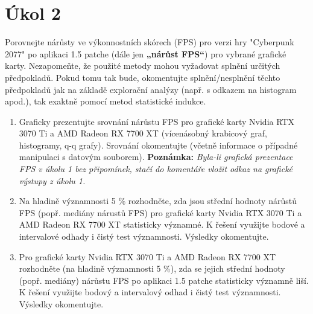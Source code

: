 \section*{Úkol 2}
\label{sec:task-2}

Porovnejte nárůsty ve výkonnostních skórech (FPS) pro verzi hry "Cyberpunk 2077" po aplikaci 1.5 patche (dále jen \textbf{„nárůst FPS“}) 
pro vybrané grafické karty. Nezapomeňte, že použité metody mohou vyžadovat splnění určitých předpokladů. Pokud tomu tak bude, okomentujte 
splnění/nesplnění těchto předpokladů jak na základě explorační analýzy (např. s odkazem na histogram apod.), tak exaktně pomocí metod statistické indukce.

\begin{enumerate}[label=\alph*]
    \item Graficky prezentujte srovnání nárůstu FPS pro grafické karty Nvidia RTX 3070 Ti a AMD Radeon RX 7700 XT (vícenásobný krabicový graf, histogramy, q-q grafy). 
    Srovnání okomentujte (včetně informace o případné manipulaci s datovým souborem). 
    \textbf{Poznámka:} \textit{Byla-li grafická prezentace FPS v úkolu 1 bez připomínek, stačí do komentáře vložit odkaz na grafické výstupy z úkolu 1.}

    \newpage
    \item Na hladině významnosti 5 \% rozhodněte, zda jsou střední hodnoty nárůstů FPS (popř. mediány nárustů FPS) pro grafické karty Nvidia RTX 3070 Ti a 
    AMD Radeon RX 7700 XT statisticky významné. K řešení využijte bodové a intervalové odhady i čistý test významnosti. Výsledky okomentujte.

    \newpage
    \item Pro grafické karty Nvidia RTX 3070 Ti a AMD Radeon RX 7700 XT rozhodněte (na hladině významnosti 5 \%), zda se jejich střední hodnoty (popř. mediány) 
    nárůstu FPS po aplikaci 1.5 patche statisticky významně liší. K řešení využijte bodový a intervalový odhad i čistý test významnosti. Výsledky okomentujte.
\end{enumerate}

\endinput